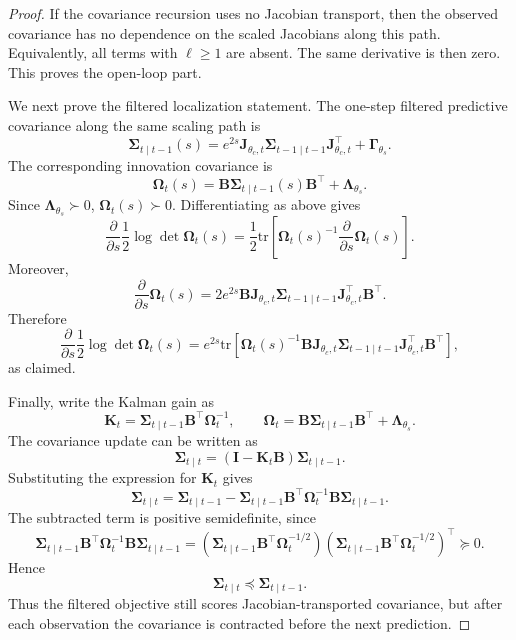 \documentclass[10pt,a4paper]{amsart}
\newcommand{\tr}{\mathrm{tr}}
\begin{document}
\begin{proof}
If the covariance recursion uses no Jacobian transport, then the observed
covariance has no dependence on the scaled Jacobians along this path. Equivalently,
all terms with $\ell\ge1$ are absent. The same derivative is then zero. This
proves the open-loop part.

We next prove the filtered localization statement. The one-step filtered
predictive covariance along the same scaling path is
\[
\bm\Sigma_{t\mid t-1}(s)
=
e^{2s}
\bm J_{\theta_c,t}\bm\Sigma_{t-1\mid t-1}
\bm J_{\theta_c,t}^{\top}
+
\bm\Gamma_{\theta_s}.
\]
The corresponding innovation covariance is
\[
\bm\Omega_t(s)
=
\bm B\bm\Sigma_{t\mid t-1}(s)\bm B^\top+\bm\Lambda_{\theta_s}.
\]
Since $\bm\Lambda_{\theta_s}\succ0$, $\bm\Omega_t(s)\succ0$. Differentiating as
above gives
\[
\frac{\partial}{\partial s}
\frac12\log\det\bm\Omega_t(s)
=
\frac12
\tr \left[
\bm\Omega_t(s)^{-1}
\frac{\partial}{\partial s}\bm\Omega_t(s)
\right].
\]
Moreover,
\[
\frac{\partial}{\partial s}\bm\Omega_t(s)
=
2e^{2s}
\bm B\bm J_{\theta_c,t}\bm\Sigma_{t-1\mid t-1}
\bm J_{\theta_c,t}^{\top}\bm B^\top.
\]
Therefore
\[
\frac{\partial}{\partial s}
\frac12\log\det\bm\Omega_t(s)
=
e^{2s}
\tr \left[
\bm\Omega_t(s)^{-1}
\bm B\bm J_{\theta_c,t}\bm\Sigma_{t-1\mid t-1}
\bm J_{\theta_c,t}^{\top}\bm B^\top
\right],
\]
as claimed.

Finally, write the Kalman gain as
\[
\bm K_t
=
\bm\Sigma_{t\mid t-1}\bm B^\top\bm\Omega_t^{-1},
\qquad
\bm\Omega_t
=
\bm B\bm\Sigma_{t\mid t-1}\bm B^\top+\bm\Lambda_{\theta_s}.
\]
The covariance update can be written as
\[
\bm\Sigma_{t\mid t}
=
(\bm I-\bm K_t\bm B)\bm\Sigma_{t\mid t-1}.
\]
Substituting the expression for $\bm K_t$ gives
\[
\bm\Sigma_{t\mid t}
=
\bm\Sigma_{t\mid t-1}
-
\bm\Sigma_{t\mid t-1}\bm B^\top
\bm\Omega_t^{-1}
\bm B\bm\Sigma_{t\mid t-1}.
\]
The subtracted term is positive semidefinite, since
\[
\bm\Sigma_{t\mid t-1}\bm B^\top
\bm\Omega_t^{-1}
\bm B\bm\Sigma_{t\mid t-1}
=
\left(
\bm\Sigma_{t\mid t-1}\bm B^\top\bm\Omega_t^{-1/2}
\right)
\left(
\bm\Sigma_{t\mid t-1}\bm B^\top\bm\Omega_t^{-1/2}
\right)^\top
\succeq0.
\]
Hence
\[
\bm\Sigma_{t\mid t}
\preceq
\bm\Sigma_{t\mid t-1}.
\]
Thus the filtered objective still scores Jacobian-transported covariance, but
after each observation the covariance is contracted before the next prediction.
\end{proof}
\end{document}
